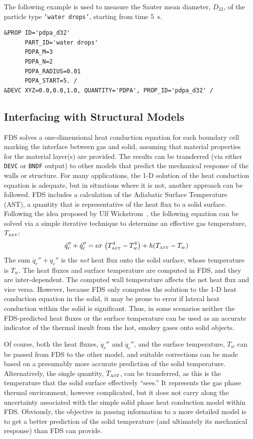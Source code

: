\documentclass[11pt]{book}
\newcommand{\ct}{\tt\small}
\newcommand{\be}{\begin{equation}}
\newcommand{\ee}{\end{equation}}
\begin{document}
\noindent The following example is used to measure the Sauter mean diameter, $D_{32}$, of the particle type {\ct 'water drops'}, starting from
time 5~s.
\footnotesize
\begin{verbatim}
&PROP ID='pdpa_d32'
      PART_ID='water drops'
      PDPA_M=3
      PDPA_N=2
      PDPA_RADIUS=0.01
      PDPA_START=5. /
&DEVC XYZ=0.0,0.0,1.0, QUANTITY='PDPA', PROP_ID='pdpa_d32' /
\end{verbatim}

\normalsize



\subsection{Interfacing with Structural Models}
\label{info:AST}

FDS solves a one-dimensional heat conduction equation for each
boundary cell marking the interface between gas and solid, assuming
that material properties for the material layer(s) are provided. The
results can be transferred (via either {\ct DEVC} or {\ct BNDF}
output) to other models that predict the mechanical response of the
walls or structure. For many applications, the 1-D solution of the
heat conduction equation is adequate, but in situations where it is
not, another approach can be followed. FDS includes a calculation of
the Adiabatic Surface Temperature (AST), a quantity that is
representative of the heat flux to a solid surface. Following the idea
proposed by Ulf Wickstrom~\cite{Wickstrom:Interflam2007}, the
following equation can be solved via a simple iterative technique to
determine an effective gas temperature, $T_{\hbox{\tiny AST}}$:
\be \dot{q}_r'' + \dot{q}_c'' = \epsilon \sigma \, \left(
T_{\hbox{\tiny AST}}^4 - T_w^4 \right) + h (T_{\hbox{\tiny AST}} - T_w)  \ee
The sum $\dot{q}_r'' + \dot{q}_c''$ is the {\em net} heat flux onto
the solid surface, whose temperature is $T_w$. The heat fluxes and
surface temperature are computed in FDS, and they are
inter-dependent. The computed wall temperature affects the net heat
flux and vice versa. However, because FDS only computes the solution
to the 1-D heat conduction equation in the solid, it may be prone to
error if lateral heat conduction within the solid is
significant. Thus, in some scenarios neither the FDS-predicted heat
fluxes or the surface temperature can be used as an accurate indicator
of the thermal insult from the hot, smokey gases onto solid objects.

Of course, both the heat fluxes, $\dot{q}_r''$ and $\dot{q}_c''$, and
the surface temperature, $T_w$ can be passed from FDS to the other
model, and suitable corrections can be made based on a presumably more
accurate prediction of the solid temperature.  Alternatively, the
single quantity, $T_{\hbox{\tiny AST}}$, can be transferred, as this
is the temperature that the solid surface effectively ``sees.'' It
represents the gas phase thermal environment, however complicated, but
it does not carry along the uncertainty associated with the simple
solid phase heat conduction model within FDS. Obviously, the objective
in passing information to a more detailed model is to get a better
prediction of the solid temperature (and ultimately its mechanical
response) than FDS can provide.
\end{document}
